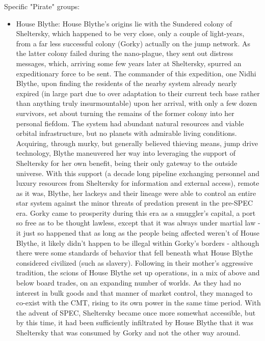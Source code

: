 Specific "Pirate" groups:
\begin{itemize}
\item House Blythe:
\label{HouseBlythe}
House Blythe's origins lie with the Sundered colony of Sheltersky,
which happened to be very close, only a couple of light-years, from a
far less successful colony (Gorky) actually on the jump network. As
the latter colony failed during the nano-plague, they sent out
distress messages, which, arriving some few years later at Sheltersky,
spurred an expeditionary force to be sent. The commander of this
expedition, one Nidhi Blythe, upon finding the residents of the nearby
system already nearly expired (in large part due to over adaptation to
their current tech base rather than anything truly insurmountable)
upon her arrival, with only a few dozen survivors, set about turning
the remains of the former colony into her personal fiefdom. The system
had abundant natural resources and viable orbital infrastructure, but
no planets with admirable living conditions. Acquiring, through murky,
but generally believed thieving means, jump drive technology, Blythe
maneuvered her way into leveraging the support of Sheltersky for her
own benefit, being their only gateway to the outside universe. With
this support (a decade long pipeline exchanging personnel and luxury
resources from Sheltersky for information and external access), remote
as it was, Blythe, her lackeys and their lineage were able to control
an entire star system against the minor threats of predation present
in the pre-SPEC era. Gorky came to prosperity during this era as a
smuggler's capital, a port so free as to be thought lawless, except
that it was always under martial law - it just so happened that as
long as the people being affected weren't of House Blythe, it likely
didn't happen to be illegal within Gorky's borders - although there
were some standards of behavior that fell beneath what House Blythe
considered civilized (such as slavery). Following in their mother's
aggressive tradition, the scions of House Blythe set up operations, in
a mix of above and below board trades, on an expanding number of
worlds. As they had no interest in bulk goods and that manner of
market control, they managed to co-exist with the CMT, rising to its
own power in the same time period. With the advent of SPEC, Sheltersky
became once more somewhat accessible, but by this time, it had been
sufficiently infiltrated by House Blythe that it was Sheltersky that
was consumed by Gorky and not the other way around.


\end{itemize}
